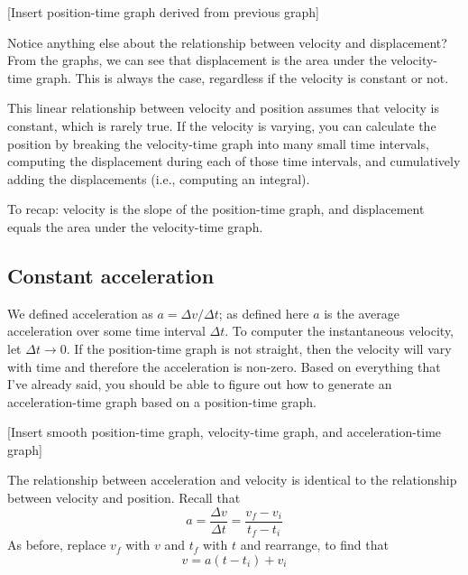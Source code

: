 [Insert position-time graph derived from previous graph]\\
\vspace{5cm}

Notice anything else about the relationship between velocity and displacement? From the graphs, we can see that displacement is the area under the velocity-time graph. This is always the case, regardless if the velocity is constant or not.

This linear relationship between velocity and position assumes that velocity is constant, which is rarely true. If the velocity is varying, you can calculate the position by breaking the velocity-time graph into many small time intervals, computing the displacement during each of those time intervals, and cumulatively adding the displacements (i.e., computing an integral). 



To recap: velocity is the slope of the position-time graph, and displacement equals the area under the velocity-time graph.


\subsection{Constant acceleration}
We defined acceleration as $a=\Delta v/\Delta t$; as defined here $a$ is the average acceleration over some time interval $\Delta t$. To computer the instantaneous velocity, let $\Delta t\rightarrow 0$. If the position-time graph is not straight, then the velocity will vary with time and therefore the acceleration is non-zero. Based on everything that I've already said, you should be able to figure out how to generate an acceleration-time graph based on a position-time graph.

[Insert smooth position-time graph, velocity-time graph, and acceleration-time graph]
\vspace{8cm}

The relationship between acceleration and velocity is identical to the relationship between velocity and position. Recall that
$$a=\frac{\Delta{v}}{\Delta{t}}=\frac{v_f-v_i}{t_f-t_i}$$
As before, replace $v_f$ with $v$ and $t_f$ with $t$ and rearrange, to find that
$$v=a(t-t_i)+v_i$$

